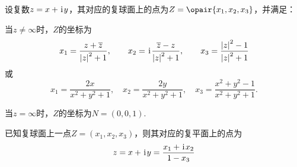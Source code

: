 \begin{theorem}
设复数\(z=x+\kern1pt\mathrm{i}\kern1pt y\)，其对应的复球面上的点为\(Z=\opair{x_1,x_2,x_3}\)，并满足：

当\(z \neq \infty\)时，\(Z\)的坐标为\begin{equation*}
x_1 = \frac{z + \overline{z}}{\abs{z}^2 + 1}, \qquad
x_2 = \kern1pt\mathrm{i}\kern1pt\frac{\overline{z} - z}{\abs{z}^2 + 1}, \qquad
x_3 = \frac{\abs{z}^2 - 1}{\abs{z}^2 + 1}
\end{equation*}或\begin{equation*}
x_1 = \frac{2x}{x^2+y^2+1}, \quad
x_2 = \frac{2y}{x^2+y^2+1}, \quad
x_3 = \frac{x^2+y^2-1}{x^2+y^2+1}.
\end{equation*}

当\(z = \infty\)时，\(Z\)的坐标为\(N = (0,0,1)\).
\end{theorem}

\begin{theorem}
已知复球面上一点\(Z=(x_1,x_2,x_3)\)，则其对应的复平面上的点为\begin{equation*}
z = x+\kern1pt\mathrm{i}\kern1pt y = \frac{x_1+\kern1pt\mathrm{i}\kern1pt x_2}{1-x_3}
\end{equation*}
\end{theorem}
